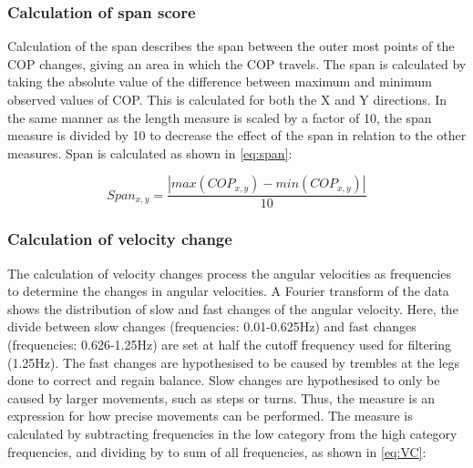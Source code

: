 \subsubsection{Calculation of span score}
Calculation of the span describes the span between the outer most points of the COP changes, giving an area in which the COP travels. 
The span is calculated by taking the absolute value of the difference between maximum and minimum observed values of COP. This is calculated for both the X and Y directions. In the same manner as the length measure is scaled by a factor of 10, the span measure is divided by 10 to decrease the effect of the span in relation to the other measures. Span is calculated as shown in \eqref{eq:span}:

\begin{equation} \label{eq:span}
Span_{x,y} = \frac{\left| max(COP_{x,y})-min(COP_{x,y})\right|}{10}
\end{equation}


\subsubsection{Calculation of velocity change}

The calculation of velocity changes process the angular velocities as frequencies to determine the changes in angular velocities. A Fourier transform of the data shows the distribution of slow and fast changes of the angular velocity. Here, the divide between slow changes (frequencies: 0.01-0.625Hz) and fast changes (frequencies: 0.626-1.25Hz) are set at half the cutoff frequency used for filtering (1.25Hz).
The fast changes are hypothesised to be caused by trembles at the legs done to correct and regain balance. Slow changes are hypothesised to only be caused by larger movements, such as steps or turns. Thus, the measure is an expression for how precise movements can be performed. The measure is calculated by subtracting frequencies in the low category from the high category frequencies, and dividing by to sum of all frequencies, as shown in \eqref{eq:VC}:


